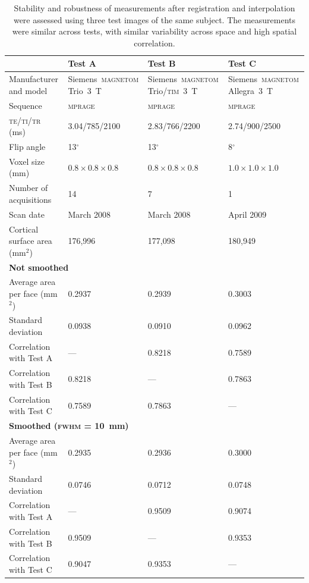\begin{table}[!tp]
\caption[Stability of areal measurements.]{Stability and robustness of measurements after registration and interpolation were assessed using three test images of the same subject. The measurements were similar across tests, with similar variability across space and high spatial correlation.}
\begin{center}
{\footnotesize
\begin{tabular}{@{}l@{}m{33mm}<{\centering}@{}m{33mm}<{\centering}@{}m{33mm}<{\centering}@{}}
\toprule
{} & \textbf{Test A} & \textbf{Test B} & \textbf{Test C}\\
\midrule
Manufacturer and model & Siemens~\textsc{magnetom} Trio~3~T & Siemens~\textsc{magnetom} Trio/\textsc{tim}~3~T & Siemens~\textsc{magnetom} Allegra~3~T \\
Sequence & \textsc{mprage} & \textsc{mprage} & \textsc{mprage} \\
\textsc{te/ti/tr} (ms) & 3.04/785/2100 & 2.83/766/2200 & 2.74/900/2500 \\
Flip angle & 13$^{\circ}$ & 13$^{\circ}$ & 8$^{\circ}$ \\
Voxel size (mm) & $0.8 \times 0.8 \times 0.8$ & $0.8 \times 0.8 \times 0.8$ & $1.0 \times 1.0 \times 1.0$ \\
Number of acquisitions & 14 & 7 & 1 \\
Scan date & March 2008 & March 2008 & April 2009 \\
Cortical surface area (mm$^2$) & 176,996 & 177,098 & 180,949 \\
\midrule
\multicolumn{4}{l}{\textbf{Not smoothed}}\\
Average area per face (mm$^2$) & 0.2937 & 0.2939 & 0.3003 \\
Standard deviation             & 0.0938 & 0.0910 & 0.0962 \\
Correlation with Test A        &    --- & 0.8218 & 0.7589 \\
Correlation with Test B        & 0.8218 &    --- & 0.7863 \\
Correlation with Test C        & 0.7589 & 0.7863 &    --- \\
\midrule
\multicolumn{4}{l}{\textbf{Smoothed (\textsc{fwhm} = 10~mm)}}\\
Average area per face (mm$^2$) & 0.2935 & 0.2936 & 0.3000 \\
Standard deviation             & 0.0746 & 0.0712 & 0.0748 \\
Correlation with Test A        &    --- & 0.9509 & 0.9074 \\
Correlation with Test B        & 0.9509 &    --- & 0.9353 \\
Correlation with Test C        & 0.9047 & 0.9353 &    --- \\
\bottomrule
\end{tabular}}
\end{center}
\label{tab:retest}
\end{table}

